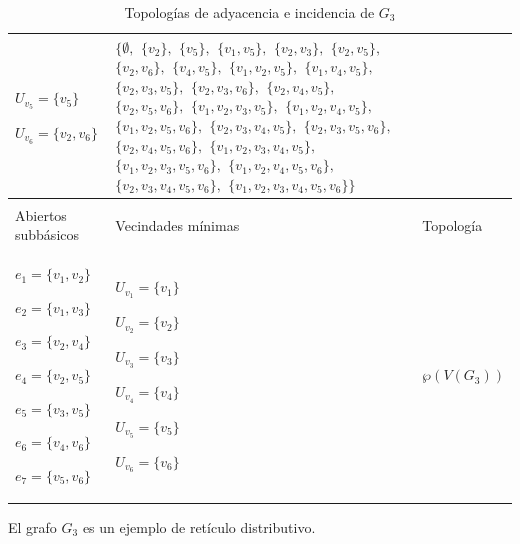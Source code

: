 \begin{table}[p]
\begin{tabular}{@{}>{\centering\arraybackslash}m{}>{\centering\arraybackslash}m{}>{\centering\arraybackslash}m{}@{}}
         ${U_{v_5}=\{v_5\}}$\par
         ${U_{v_6}=\{v_2,v_6\}}$
      &
         $\{\emptyset,$ $\{v_2\},$ $\{v_5\},$ $\{v_1,v_5\},$ $\{v_2,v_3\},$ $\{v_2,v_5\},$ $\{v_2,v_6\},$ $\{v_4,v_5\},$ $\{v_1,v_2,v_5\},$ $\{v_1,v_4,v_5\},$ $\{v_2,v_3,v_5\},$ $\{v_2,v_3,v_6\},$ $\{v_2,v_4,v_5\},$ $\{v_2,v_5,v_6\},$ $\{v_1,v_2,v_3,v_5\},$ $\{v_1,v_2,v_4,v_5\},$ $\{v_1,v_2,v_5,v_6\},$ $\{v_2,v_3,v_4,v_5\},$ $\{v_2,v_3,v_5,v_6\},$ $\{v_2,v_4,v_5,v_6\},$ $\{v_1,v_2,v_3,v_4,v_5\},$ $\{v_1,v_2,v_3,v_5,v_6\},$ $\{v_1,v_2,v_4,v_5,v_6\},$ $\{v_2,v_3,v_4,v_5,v_6\},$ $\{v_1,\allowbreak v_2,\allowbreak v_3,\allowbreak v_4,\allowbreak v_5,\allowbreak v_6\}\}$ \\[6pt]
      \hline
      \multicolumn{3}{c}{\textbf{Topología de incidencia}} \\
      \hline
      Abiertos subbásicos & Vecindades mínimas & Topología \\
      \hline
         ${e_{1}=\{v_1,v_2\}}$\par
         ${e_{2}=\{v_1,v_3\}}$\par
         ${e_{3}=\{v_2,v_4\}}$\par
         ${e_{4}=\{v_2,v_5\}}$\par
         ${e_{5}=\{v_3,v_5\}}$\par
         ${e_{6}=\{v_4,v_6\}}$\par
         ${e_{7}=\{v_5,v_6\}}$
      &
         ${U_{v_1}=\{v_1\}}$\par
         ${U_{v_2}=\{v_2\}}$\par
         ${U_{v_3}=\{v_3\}}$\par
         ${U_{v_4}=\{v_4\}}$\par
         ${U_{v_5}=\{v_5\}}$\par
         ${U_{v_6}=\{v_6\}}$
      &
         $\wp\left(V\left(G_3\right)\right)$ \\[6pt]
      \hline
   \end{tabular}
   \caption{Topologías de adyacencia e incidencia de $G_3$}
   \label{tab:topologias_G_3}

   \vspace{2em}
   \begin{minipage}{\textwidth}
      \normalsize
      El grafo $G_3$ es un ejemplo de retículo distributivo.
   \end{minipage}
\end{table}
